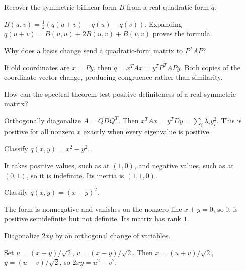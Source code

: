 \begin{problem}[Polarization]\label{prob:i17-problem-02}
Recover the symmetric bilinear form $B$ from a real quadratic form $q$.
\end{problem}
\begin{solution}
$B(u,v)=\frac12(q(u+v)-q(u)-q(v))$. Expanding $q(u+v)=B(u,u)+2B(u,v)+B(v,v)$ proves the formula.
\end{solution}

\begin{problem}\label{prob:i17-problem-03}
Why does a basis change send a quadratic-form matrix to $P^TAP$?
\end{problem}
\begin{solution}
If old coordinates are $x=Py$, then $q=x^TAx=y^TP^TAPy$. Both copies of the coordinate vector change, producing congruence rather than similarity.
\end{solution}

\begin{problem}\label{prob:i17-problem-04}
How can the spectral theorem test positive definiteness of a real symmetric matrix?
\end{problem}
\begin{solution}
Orthogonally diagonalize $A=QDQ^T$. Then $x^TAx=y^TDy=\sum_i\lambda_i y_i^2$. This is positive for all nonzero $x$ exactly when every eigenvalue is positive.
\end{solution}

\begin{problem}\label{prob:i17-problem-05}
Classify $q(x,y)=x^2-y^2$.
\end{problem}
\begin{solution}
It takes positive values, such as at $(1,0)$, and negative values, such as at $(0,1)$, so it is indefinite. Its inertia is $(1,1,0)$.
\end{solution}

\begin{problem}\label{prob:i17-problem-06}
Classify $q(x,y)=(x+y)^2$.
\end{problem}
\begin{solution}
The form is nonnegative and vanishes on the nonzero line $x+y=0$, so it is positive semidefinite but not definite. Its matrix has rank $1$.
\end{solution}

\begin{problem}\label{prob:i17-problem-07}
Diagonalize $2xy$ by an orthogonal change of variables.
\end{problem}
\begin{solution}
Set $u=(x+y)/\sqrt2$, $v=(x-y)/\sqrt2$. Then $x=(u+v)/\sqrt2$, $y=(u-v)/\sqrt2$, so $2xy=u^2-v^2$.
\end{solution}

